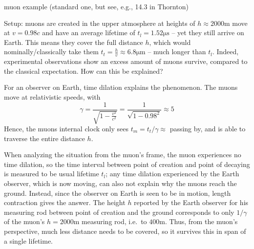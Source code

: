 \documentclass[../relativity_main.tex]{subfiles}
\begin{document}
\begin{ex}
	muon example (standard one, but see, e.g., 14.3 in Thornton)

	Setup: muons are created in the upper atmosphere  at heights of $h \approx 2000 \unit{\meter}$ move at $v = 0.98 c$ and have an average lifetime of $t_l = 1.52 \unit{\micro \second}$ -- yet they still arrive on Earth. This means they cover the full distance $h$, which would nominally/classically take them $t_t = \frac{h}{v} \approx 6.8 \unit{\micro \meter}$ -- much longer than $t_l$. Indeed, experimental observations show an excess amount of muons survive, compared to the classical expectation. How can this be explained?


	For an observer on Earth, time dilation explains the phenomenon. The muons move at relativistic speeds, with
	\begin{equation}
		\gamma = \frac{1}{\sqrt{1 - \frac{v^2}{c^2}}} = \frac{1}{\sqrt{1 - 0.98^2}} \approx 5
	\end{equation}
	Hence, the muons internal clock only sees $t_m = t_t / \gamma \approx $ passing by, and is able to traverse the entire distance $h$.

	

	When analyzing the situation from the muon's frame, the muon experiences no time dilation, so the time interval between point of creation and point of decaying is measured to be usual lifetime $t_l$; any time dilation experienced by the Earth observer, which is now moving, can also not explain why the muons reach the ground. Instead, since the observer on Earth is seen to be in motion, length contraction gives the answer. The height $h$ reported by the Earth observer for his measuring rod between point of creation and the ground corresponds to only $1/\gamma$ of the muon's $h = 2000 \unit{\meter}$ measuring rod, i.e.~to $400 \unit{\meter}$. Thus, from the muon's perspective, much less distance needs to be covered, so it survives this in span of a single lifetime.



\end{ex}
\end{document}
